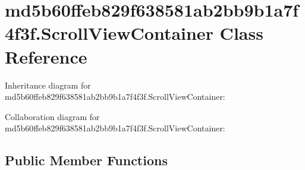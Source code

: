 \hypertarget{classmd5b60ffeb829f638581ab2bb9b1a7f4f3f_1_1_scroll_view_container}{}\section{md5b60ffeb829f638581ab2bb9b1a7f4f3f.\+Scroll\+View\+Container Class Reference}
\label{classmd5b60ffeb829f638581ab2bb9b1a7f4f3f_1_1_scroll_view_container}


Inheritance diagram for md5b60ffeb829f638581ab2bb9b1a7f4f3f.\+Scroll\+View\+Container\+:


Collaboration diagram for md5b60ffeb829f638581ab2bb9b1a7f4f3f.\+Scroll\+View\+Container\+:
\subsection*{Public Member Functions}
